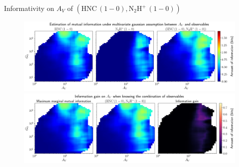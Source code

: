 \documentclass{beamer}
\begin{document}
\begin{frame}{Informativity on $A_V$ of $\left(\mathrm{HNC\,(1-0)},\mathrm{N_2H^+\,(1-0)}\right)$}
    \begin{figure}
        \centering
        \includegraphics[width=0.95\linewidth]{../linearinfo/av__hnc10_n2hp10_linearinfo.png}
        \vfill
        \includegraphics[width=0.95\linewidth]{../linearinfo/av__hnc10_n2hp10_linearinfo_gain.png}
    \end{figure}
\end{frame}
\end{document}

